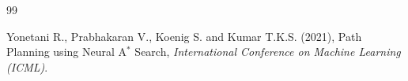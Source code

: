 \documentclass[10pt,twoside]{article}
\numberwithin{equation}{section}
\begin{document}
\begin{thebibliography}{99}




		




		Yonetani R., Prabhakaran V., Koenig S. and Kumar T.K.S. (2021), Path Planning using Neural A$^*$ Search, {\it International Conference on Machine Learning (ICML)}.


				


	\end{thebibliography}
\end{document}

